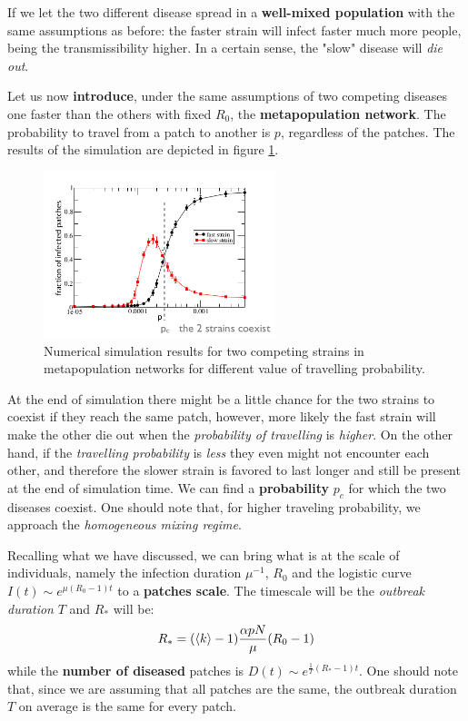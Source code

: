 \documentclass[../main/main.tex]{subfiles}
\begin{document}
If we let the two different disease spread in a \textbf{well-mixed population} with the same assumptions as before: the faster strain will infect faster much more people, being the transmissibility higher. In a certain sense, the "slow" disease will \textit{die out}.

Let us now \textbf{introduce}, under the same assumptions of two competing diseases one faster than the others with fixed $R_0$, the \textbf{metapopulation network}. The probability to travel from a patch to another is $p$, regardless of the patches. The results of the simulation are depicted in figure \ref{fig:16_09}.

\begin{figure}[h!]
\centering
\includegraphics[width=0.6\textwidth]{../lessons/image/16/image09.png}
\caption{\label{fig:16_09} Numerical simulation results for two competing strains in metapopulation networks for different value of travelling probability.}
\end{figure}

At the end of simulation there might be a little chance for the two strains to coexist if they reach the same patch, however, more likely the fast strain will make the other die out when the \textit{probability of travelling} is \textit{higher}. On the other hand, if the \textit{travelling probability} is \textit{less} they even might not encounter each other, and therefore the slower strain is favored to last longer and still be present at the end of simulation time. We can find a \textbf{probability} $p_c$ for which the two diseases coexist. One should note that, for higher traveling probability, we approach the \textit{homogeneous mixing regime}.

Recalling what we have discussed, we can bring what is at the scale of individuals, namely the infection duration $\mu^{-1}$, $R_0$ and the logistic curve $I(t) \sim e^{\mu(R_0-1)t}$ to a \textbf{patches scale}. The timescale will be the \textit{outbreak duration} $T$ and $R_*$ will be:
\begin{equation}
R_* = (\expval{k}-1) \frac{\alpha p N}{\mu} (R_0 - 1)
\end{equation}
while the \textbf{number of diseased} patches is $D(t) \sim e^{\frac{1}{T}(R_* - 1) t}$. One should note that, since we are assuming that all patches are the same, the outbreak duration $T$ on average is the same for every patch.
\end{document}
